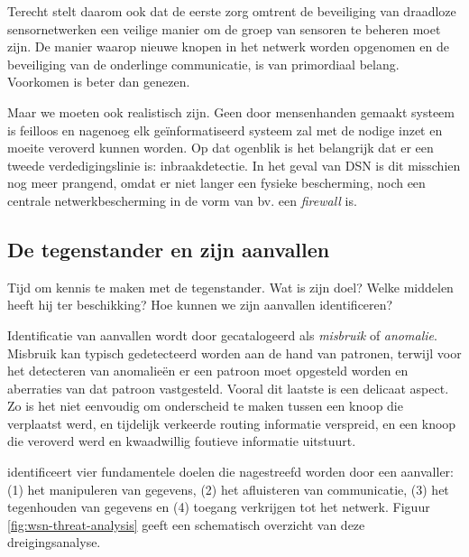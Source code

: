 Terecht stelt \citep{perrig2004security} daarom ook dat de eerste zorg omtrent
de beveiliging van draadloze sensornetwerken een veilige manier om de groep van
sensoren te beheren moet zijn. De manier waarop nieuwe knopen in het netwerk
worden opgenomen en de beveiliging van de onderlinge communicatie, is van
primordiaal belang. Voorkomen is beter dan genezen.

Maar we moeten ook realistisch zijn. Geen door mensenhanden gemaakt systeem is
feilloos en nagenoeg elk ge\"informatiseerd systeem zal met de nodige inzet en
moeite veroverd kunnen worden. Op dat ogenblik is het belangrijk dat er een
tweede verdedigingslinie is: inbraakdetectie. In het geval van DSN is dit
misschien nog meer prangend, omdat er niet langer een fysieke bescherming, noch
een centrale netwerkbescherming in de vorm van bv. een \emph{firewall} is.

\subsection{De tegenstander en zijn aanvallen}

Tijd om kennis te maken met de tegenstander. Wat is zijn doel? Welke middelen
heeft hij ter beschikking? Hoe kunnen we zijn aanvallen identificeren?

Identificatie van aanvallen wordt door \citep{zhang2000intrusion} gecatalogeerd
als \emph{misbruik} of \emph{anomalie}. Misbruik kan typisch gedetecteerd
worden aan de hand van patronen, terwijl voor het detecteren van anomalie\"en
er een patroon moet opgesteld worden en aberraties van dat patroon vastgesteld.
Vooral dit laatste is een delicaat aspect. Zo is het niet eenvoudig om
onderscheid te maken tussen een knoop die verplaatst werd, en tijdelijk
verkeerde routing informatie verspreid, en een knoop die veroverd werd en
kwaadwillig foutieve informatie uitstuurt.

\citep{aschenbruck2012security} identificeert vier fundamentele doelen die
nagestreefd worden door een aanvaller: (1) het manipuleren van gegevens, (2)
het afluisteren van communicatie, (3) het tegenhouden van gegevens en (4)
toegang verkrijgen tot het netwerk. Figuur \ref{fig:wsn-threat-analysis} geeft
een schematisch overzicht van deze dreigingsanalyse.

